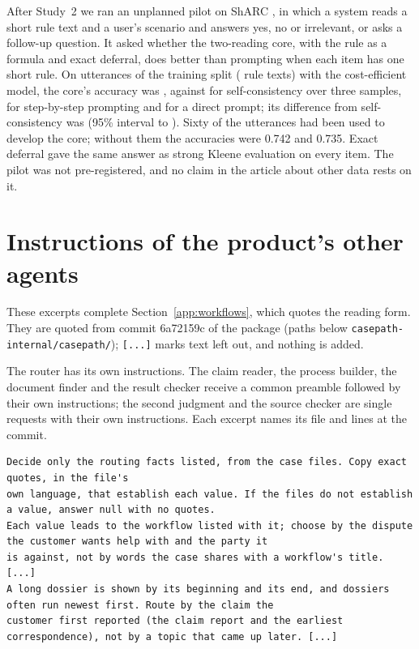 \documentclass[acmsmall,screen,nonacm]{acmart}
\begin{document}
After Study~2 we ran an unplanned pilot on ShARC \cite{saeidi2018sharc}, in which a system reads a short rule text and a user's scenario and answers yes, no or irrelevant, or asks a follow-up question. It asked whether the two-reading core, with the rule as a formula and exact deferral, does better than prompting when each item has one short rule. On \sharcN{} utterances of the training split (\sharcClusters{} rule texts) with the cost-efficient model, the core's accuracy was \sharcCoreMicro, against \sharcSCMicro{} for self-consistency over three samples, \sharcStepsMicro{} for step-by-step prompting and \sharcDirectMicro{} for a direct prompt; its difference from self-consistency was \sharcCoreVsSCDiff{} (95\% interval \sharcCoreVsSCLo{} to \sharcCoreVsSCHi). Sixty of the \sharcN{} utterances had been used to develop the core; without them the accuracies were 0.742 and 0.735. Exact deferral gave the same answer as strong Kleene evaluation on every item. The pilot was not pre-registered, and no claim in the article about other data rests on it.

\section{Instructions of the product's other agents}
\label{supp:agent-prompts}

These excerpts complete Section~\ref{app:workflows}, which quotes the reading form. They are quoted from commit 6a72159c of the package (paths below \texttt{casepath-internal/\allowbreak{}casepath/}); \texttt{[...]} marks text left out, and nothing is added.

The router has its own instructions. The claim reader, the process builder, the document finder and the result checker receive a common preamble followed by their own instructions; the second judgment and the source checker are single requests with their own instructions. Each excerpt names its file and lines at the commit.

\begin{lstlisting}[title={\textbf{Router} (\texttt{agents/core.py}, lines 54--61, excerpt)}]
Decide only the routing facts listed, from the case files. Copy exact quotes, in the file's
own language, that establish each value. If the files do not establish a value, answer null with no quotes.
Each value leads to the workflow listed with it; choose by the dispute the customer wants help with and the party it
is against, not by words the case shares with a workflow's title. [...]
A long dossier is shown by its beginning and its end, and dossiers often run newest first. Route by the claim the
customer first reported (the claim report and the earliest correspondence), not by a topic that came up later. [...]
\end{lstlisting}
\end{document}

